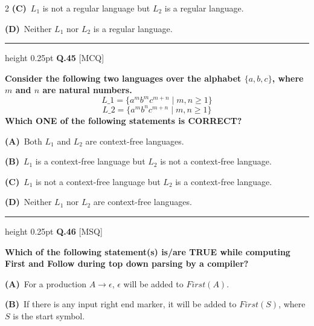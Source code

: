 \documentclass[a4paper,10pt,twoside]{article}
\begin{document}
\begin{multicols}{2}
\textbf{(C)}~$L_1$ is not a regular language but $L_2$ is a regular language.\par\vspace{2pt}\noindent
\textbf{(D)}~Neither $L_1$ nor $L_2$ is a regular language.
\par\vspace{6pt}\hrule height 0.25pt\vspace{6pt}
\noindent\textbf{Q.45} \hfill {\footnotesize\textsf{[MCQ]}}
\par\vspace{2pt}
{\bfseries Consider the following two languages over the alphabet $\{a, b, c\}$, where $m$ and $n$ are natural numbers.
\[ L\_1 = \{a^mb^mc^{m+n} \mid m, n \ge 1\} \]
\[ L\_2 = \{a^mb^nc^{m+n} \mid m, n \ge 1\} \]
Which ONE of the following statements is CORRECT? \par}
\par\vspace{2pt}\noindent
\textbf{(A)}~Both $L_1$ and $L_2$ are context-free languages.\par\vspace{2pt}\noindent
\textbf{(B)}~$L_1$ is a context-free language but $L_2$ is not a context-free language.\par\vspace{2pt}\noindent
\textbf{(C)}~$L_1$ is not a context-free language but $L_2$ is a context-free language.\par\vspace{2pt}\noindent
\textbf{(D)}~Neither $L_1$ nor $L_2$ are context-free languages.
\par\vspace{6pt}\hrule height 0.25pt\vspace{6pt}
\noindent\textbf{Q.46} \hfill {\footnotesize\textsf{[MSQ]}}
\par\vspace{2pt}
{\bfseries Which of the following statement(s) is/are TRUE while computing First and Follow during top down parsing by a compiler? \par}
\par\vspace{2pt}\noindent
\textbf{(A)}~For a production $A \to \epsilon$, $\epsilon$ will be added to $First(A)$.\par\vspace{2pt}\noindent
\textbf{(B)}~If there is any input right end marker, it will be added to $First(S)$, where $S$ is the start symbol.\par\vspace{2pt}\noindent

\end{multicols}
\end{document}
